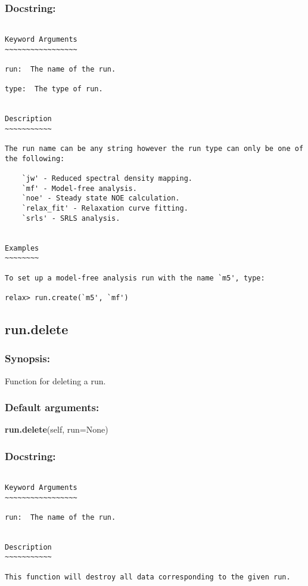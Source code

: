 \subsubsection{Docstring:}

{\scriptsize
\begin{verbatim}

Keyword Arguments
~~~~~~~~~~~~~~~~~

run:  The name of the run.

type:  The type of run.


Description
~~~~~~~~~~~

The run name can be any string however the run type can only be one of the following:

    `jw' - Reduced spectral density mapping.
    `mf' - Model-free analysis.
    `noe' - Steady state NOE calculation.
    `relax_fit' - Relaxation curve fitting.
    `srls' - SRLS analysis.


Examples
~~~~~~~~

To set up a model-free analysis run with the name `m5', type:

relax> run.create(`m5', `mf')
\end{verbatim}
}



\newpage

\subsection{run.delete}


\subsubsection{Synopsis:}

Function for deleting a run.

\subsubsection{Default arguments:}

\textsf{\textbf{run.delete}(self, run=None)
}


\subsubsection{Docstring:}

{\scriptsize
\begin{verbatim}

Keyword Arguments
~~~~~~~~~~~~~~~~~

run:  The name of the run.


Description
~~~~~~~~~~~

This function will destroy all data corresponding to the given run.
\end{verbatim}
}



